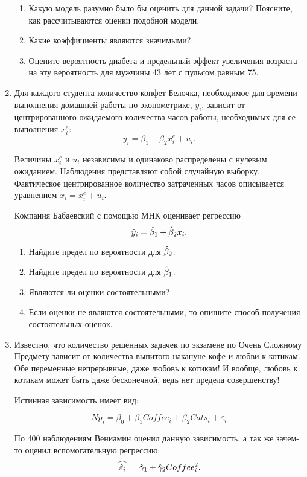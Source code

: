 \begin{enumerate}
\begin{enumerate}
  \item Какую модель разумно было бы оценить для данной задачи? Поясните, как рассчитываются оценки подобной модели. 
  \item Какие коэффициенты являются значимыми?
  \item Оцените вероятность диабета и предельный эффект увеличения возраста на эту вероятность для 
  мужчины 43 лет с пульсом равным 75. 
\end{enumerate}

\item Для каждого студента количество конфет Белочка, необходимое для времени выполнения домашней работы по эконометрике, 
$y_i$, зависит от центрированного ожидаемого количества часов работы, необходимых для ее выполнения $x_i^e$:
\[
y_i = \beta_1 + \beta_2 x_i^e + u_i.  
\]

Величины $x_i^e$ и $u_i$ независимы и одинаково распределены с нулевым ожиданием. 
Наблюдения представляют собой случайную выборку. 
Фактическое центрированное количество затраченных часов описывается уравнением $x_i = x_i^e + u_i$.

Компания Бабаевский с помощью МНК оценивает регрессию
\[
\hat y_i = \hat{\beta}_1 + \hat{\beta}_2 x_i.  
\]

\begin{enumerate}
  \item Найдите предел по вероятности для $\hat{\beta}_2$.
\item Найдите предел по вероятности для $\hat{\beta}_1$.
\item Являются ли оценки состоятельными?
\item Если оценки не являются состоятельными, то опишите способ получения состоятельных оценок. 
\end{enumerate}

\item 
Известно, что количество решённых задачек по экзамене по 
Очень Сложному Предмету зависит от количества выпитого накануне кофе и любви к котикам.
Обе переменные непрерывные, даже любовь к котикам! 
И вообще, любовь к котикам может быть даже бесконечной, ведь нет предела совершенству! 

Истинная зависимость имеет вид:

\[ 
  Np_i = \beta_0 + \beta_1 Coffee_i + \beta_2 Cats_i + \varepsilon_i 
\]
  
По 400 наблюдениям Вениамин оценил данную зависимость, а так же зачем-то оценил вспомогательную регрессию:
\[
  \widehat{ \abs{\hat \varepsilon_i}} = \hat \gamma_1 + \hat \gamma_2 Coffee_i^2.
\]


\end{enumerate}
